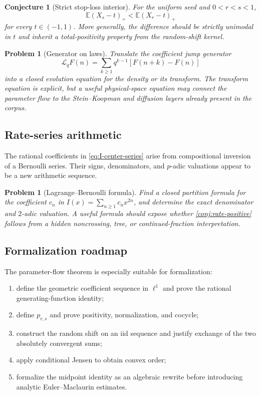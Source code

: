 \documentclass[11pt,a4paper]{article}
\newtheorem{conjecture}[theorem]{Conjecture}
\newtheorem{problem}[theorem]{Problem}
\theoremstyle{definition}
\newcommand{\E}{\mathbb{E}}
\newcommand{\1}{\mathbf{1}}
\begin{document}
\begin{conjecture}[Strict stop-loss interior]
For the uniform seed and $0<r<s<1$,
\[
 \E(X_s-t)_+<\E(X_r-t)_+
\]
for every $t\in(-1,1)$.  More generally, the difference should be strictly unimodal in $t$
and inherit a total-positivity property from the random-shift kernel.
\end{conjecture}

\begin{problem}[Generator on laws]
Translate the coefficient jump generator
\[
 \mathcal L_qF(n)=\sum_{k\ge1}q^{k-1}[F(n+k)-F(n)]
\]
into a closed evolution equation for the density or its transform.  The
transform equation is explicit, but a useful physical-space equation may
connect the parameter flow to the Stein--Koopman and diffusion layers already
present in the corpus.
\end{problem}

\subsection{Rate-series arithmetic}

The rational coefficients in \eqref{eq:I-center-series} arise from
compositional inversion of a Bernoulli series.  Their signs, denominators,
and $p$-adic valuations appear to be a new arithmetic sequence.

\begin{problem}[Lagrange--Bernoulli formula]
Find a closed partition formula for the coefficient $c_n$ in
$I(x)=\sum_{n\ge1}c_nx^{2n}$, and determine the exact denominator and
$2$-adic valuation.  A useful formula should expose whether
\cref{conj:rate-positive} follows from a hidden noncrossing, tree, or
continued-fraction interpretation.
\end{problem}

\subsection{Formalization roadmap}

The parameter-flow theorem is especially suitable for formalization:

\begin{enumerate}
\item define the geometric coefficient sequence in $\ell^1$ and prove the
rational generating-function identity;
\item define $p_{r,s}$ and prove positivity, normalization, and cocycle;
\item construct the random shift on an iid sequence and justify exchange of
the two absolutely convergent sums;
\item apply conditional Jensen to obtain convex order;
\item formalize the midpoint identity as an algebraic rewrite before
introducing analytic Euler--Maclaurin estimates.
\end{enumerate}
\end{document}
